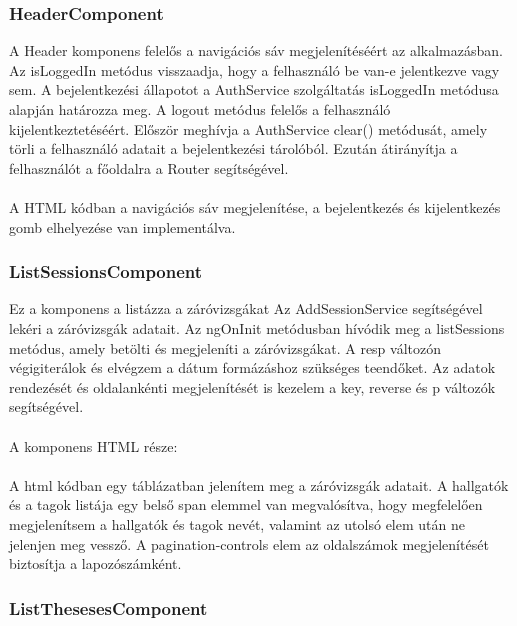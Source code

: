 \subsubsection{HeaderComponent}

A Header komponens felelős a navigációs sáv megjelenítéséért az alkalmazásban. Az isLoggedIn metódus visszaadja, hogy a felhasználó be van-e jelentkezve vagy sem. A bejelentkezési állapotot a AuthService szolgáltatás isLoggedIn metódusa alapján határozza meg. A logout metódus felelős a felhasználó kijelentkeztetéséért. Először meghívja a AuthService clear() metódusát, amely törli a felhasználó adatait a bejelentkezési tárolóból. Ezután átirányítja a felhasználót a főoldalra a Router segítségével.\\
\\
A HTML kódban a navigációs sáv megjelenítése, a bejelentkezés és kijelentkezés gomb elhelyezése van implementálva.


\subsubsection{ListSessionsComponent}

Ez a komponens a listázza a záróvizsgákat Az AddSessionService segítségével lekéri a záróvizsgák adatait. Az ngOnInit metódusban hívódik meg a listSessions metódus, amely betölti és megjeleníti a záróvizsgákat. A resp változón végigiterálok és elvégzem a dátum formázáshoz szükséges teendőket. Az adatok rendezését és oldalankénti megjelenítését is kezelem a key, reverse és p változók segítségével.\\
\\
A komponens HTML része:\\
\\
A html kódban egy táblázatban jelenítem meg a záróvizsgák adatait.  A hallgatók és a tagok listája egy belső span elemmel van megvalósítva, hogy megfelelően megjelenítsem a hallgatók és tagok nevét, valamint az utolsó elem után ne jelenjen meg vessző. A pagination-controls elem az oldalszámok megjelenítését biztosítja a lapozószámként.

\subsubsection{ListThesesesComponent}


